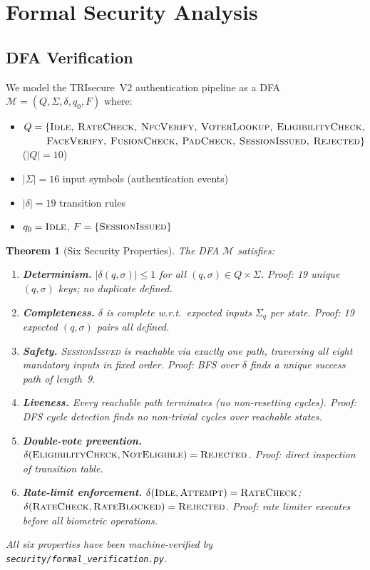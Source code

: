 \documentclass[preprint,12pt]{elsarticle}
\newtheorem{theorem}{Theorem}[section]
\begin{document}
\section{Formal Security Analysis}
\label{sec:security}

\subsection{DFA Verification}
\label{sec:dfa}

We model the TRIsecure~V2 authentication pipeline as a DFA
$\mathcal{M} = (Q, \Sigma, \delta, q_0, F)$ where:

\begin{itemize}
  \item $Q = \{\textsc{Idle, RateCheck, NfcVerify, VoterLookup, EligibilityCheck,}$\\
    $\quad\quad\;\textsc{FaceVerify, FusionCheck, PadCheck, SessionIssued, Rejected}\}$
    ($|Q|=10$)
  \item $|\Sigma| = 16$ input symbols (authentication events)
  \item $|\delta| = 19$ transition rules
  \item $q_0 = \textsc{Idle}$, $F = \{\textsc{SessionIssued}\}$
\end{itemize}

\begin{theorem}[Six Security Properties]
The DFA $\mathcal{M}$ satisfies:
\begin{enumerate}[label=P\arabic*.]
  \item \textbf{Determinism.} $|\delta(q,\sigma)| \leq 1$ for all $(q,\sigma) \in Q \times \Sigma$.
    \textit{Proof: 19 unique $(q,\sigma)$ keys; no duplicate defined.}
  \item \textbf{Completeness.} $\delta$ is complete w.r.t.\ expected inputs $\Sigma_q$ per state.
    \textit{Proof: 19 expected $(q,\sigma)$ pairs all defined.}
  \item \textbf{Safety.} \textsc{SessionIssued} is reachable via exactly one path, traversing
    all eight mandatory inputs in fixed order.
    \textit{Proof: BFS over $\delta$ finds a unique success path of length~9.}
  \item \textbf{Liveness.} Every reachable path terminates (no non-resetting cycles).
    \textit{Proof: DFS cycle detection finds no non-trivial cycles over reachable states.}
  \item \textbf{Double-vote prevention.} $\delta(\textsc{EligibilityCheck}, \textsc{NotEligible}) = \textsc{Rejected}$.
    \textit{Proof: direct inspection of transition table.}
  \item \textbf{Rate-limit enforcement.} $\delta(\textsc{Idle}, \textsc{Attempt}) = \textsc{RateCheck}$;
    $\delta(\textsc{RateCheck}, \textsc{RateBlocked}) = \textsc{Rejected}$.
    \textit{Proof: rate limiter executes before all biometric operations.}
\end{enumerate}
All six properties have been machine-verified by \texttt{security/formal\_verification.py}.
\end{theorem}
\end{document}
